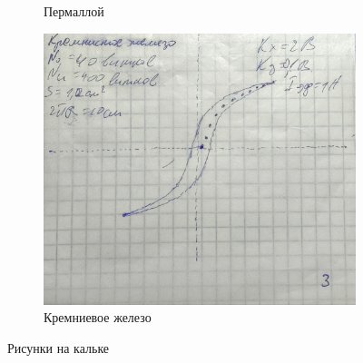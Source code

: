 \documentclass[a4paper]{article}
\begin{document}
\begin{figure}[htbp]
\begin{subfigure}[b]{0.3\textwidth}
    \caption{Пермаллой} 
    \label{fig:image2}
\end{subfigure}
\hfill
\begin{subfigure}[b]{0.3\textwidth}
    \includegraphics[width=\linewidth]{p3.jpg}
    \caption{Кремниевое железо} 
    \label{fig:image3}
\end{subfigure}
    
\caption{Рисунки на кальке} 
\label{fig:three_images}

\end{figure}
\end{document}
